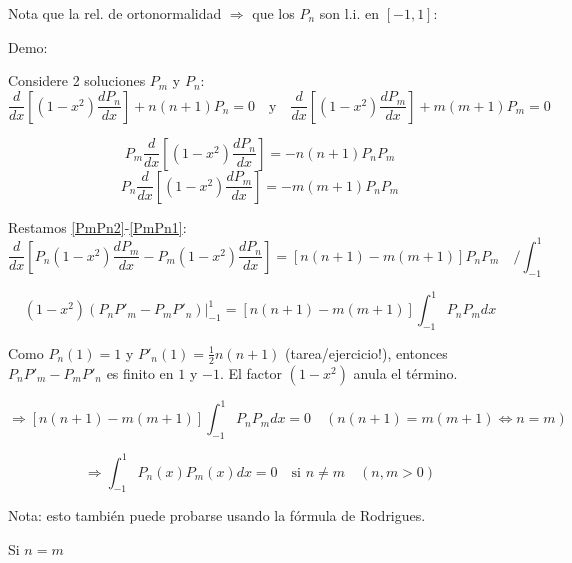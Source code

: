 Nota que la rel. de ortonormalidad $\Rightarrow$ que los $P_n$ son l.i. en $[-1,1]$:
\begin{equation}
    [\sum a_n P_n(x) = 0 \Rightarrow \sum a_n \int P_n P_m dx = 0 \Rightarrow \sum \frac{2 a_n}{2n+1} \delta_{nm} = 0 \Rightarrow a_m = 0]
\end{equation}

Demo:

Considere 2 soluciones $P_m$ y $P_n$:
\begin{equation}
    \frac{d}{dx}[(1-x^2) \frac{dP_n}{dx}] + n(n+1) P_n = 0 \quad \text{y} \quad \frac{d}{dx}[(1-x^2) \frac{dP_m}{dx}] + m(m+1) P_m = 0
\end{equation}

\begin{equation}
    P_m \frac{d}{dx}[(1-x^2) \frac{dP_n}{dx}] = -n(n+1) P_n P_m  \label{PmPn1}
\end{equation}
\begin{equation}
    P_n \frac{d}{dx}[(1-x^2) \frac{dP_m}{dx}] = -m(m+1) P_n P_m \label{PmPn2}
\end{equation}

Restamos \eqref{PmPn2}-\eqref{PmPn1}:
\begin{equation}
    \frac{d}{dx} [P_n (1-x^2) \frac{dP_m}{dx} - P_m (1-x^2) \frac{dP_n}{dx}] = [n(n+1) - m(m+1)] P_n P_m \quad / \int_{-1}^{1}
\end{equation}

\begin{equation}
    (1-x^2) (P_n P'_m - P_m P'_n) \Big|_{-1}^{1} = [n(n+1) - m(m+1)] \int_{-1}^{1} P_n P_m dx
\end{equation}

Como $P_n(1) = 1$ y $P'_n(1) = \frac{1}{2} n(n+1)$ (tarea/ejercicio!), entonces $P_n P'_m - P_m P'_n$ es finito en $1$ y $-1$.
El factor $(1-x^2)$ anula el término.

\begin{equation}
    \Rightarrow [n(n+1) - m(m+1)] \int_{-1}^{1} P_n P_m dx = 0 \quad (n(n+1) = m(m+1) \Leftrightarrow n=m)
\end{equation}

\begin{equation}
    \Rightarrow \int_{-1}^{1} P_n(x) P_m(x) dx = 0 \quad \text{si } n \neq m \quad (n,m > 0)
\end{equation}

Nota: esto también puede probarse usando la fórmula de Rodrigues.

Si $n=m$

